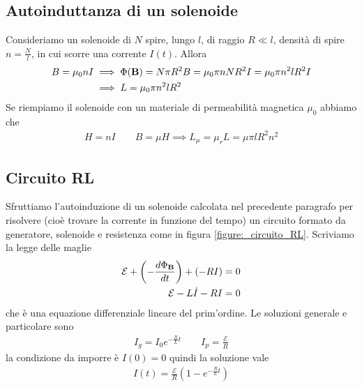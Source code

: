 \subsection{Autoinduttanza di un solenoide}
Consideriamo un solenoide di $ N $ spire, lungo $ l $, di raggio $ R\ll l $, densità di spire$ n = \frac{N}{l} $, in cui scorre una corrente $ I(t) $. 
Allora
\begin{align}
  B = \mu_0 n I &\implies \Phi(\mathbf{ B }) = N \pi R^2 B = \mu_0 \pi n N R^2 I = \mu_0 \pi n^2 l R^2 I
  \\
  &\implies L = \mu_0 \pi n^2 l R^2
\end{align}
Se riempiamo il solenoide con un materiale di permeabilità magnetica $ \mu_0 $ abbiamo che
\begin{align}
  H = n I \qquad B = \mu H \implies L_\mu = \mu_r L = \mu \pi l R^2 n^2
\end{align}

\subsection{Circuito RL}
Sfruttiamo l'autoinduzione di un solenoide calcolata nel precedente paragrafo per risolvere (cioè trovare la corrente in funzione del tempo) 
un circuito formato da generatore, solenoide e resistenza come in figura \ref{figure:_circuito_RL}.
Scriviamo la legge delle maglie
\begin{align}
  \mathcal{E} + \left( - \frac{d\Phi_{\mathbf{ B }}}{dt} \right) + \left(  -RI \right) &= 0
  \\
  \mathcal{E} - L \dot I - RI &= 0
\end{align}
che è una equazione differenziale lineare del prim'ordine. Le soluzioni generale e particolare sono
\begin{align}
  I_g = I_0 e^{-\frac{R}{L} t}  \qquad I_p = \frac{\mathcal{E}}{R}
\end{align}
la condizione da imporre è $ I(0) = 0 $ quindi la soluzione vale
\begin{align}
  I(t) = \frac{\mathcal{E}}{R} \left( 1-e^{-\frac{R}{L} t} \right)
\end{align}

